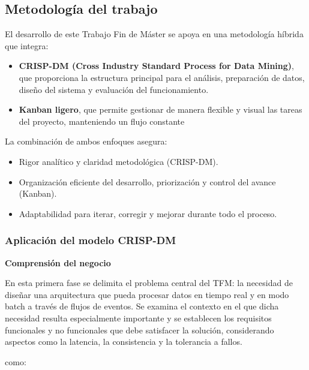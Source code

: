 \documentclass[12pt,a4paper]{article}
\providecommand{\tightlist}{%
  \setlength{\itemsep}{0pt}\setlength{\parskip}{0pt}}
\begin{document}
\subsection{Metodología del trabajo}\label{metodologuxeda-del-trabajo}

El desarrollo de este Trabajo Fin de Máster se apoya en una metodología híbrida que integra:

\begin{itemize}
    \tightlist
    \item
          \textbf{CRISP-DM (Cross Industry Standard Process for Data Mining)}, que proporciona la estructura principal para el análisis, preparación de datos, diseño del sistema y evaluación del funcionamiento.
    \item
          \textbf{Kanban ligero}, que permite gestionar de manera flexible y visual las tareas del proyecto, manteniendo un flujo constante
\end{itemize}

La combinación de ambos enfoques asegura:

\begin{itemize}
    \tightlist
    \item
          Rigor analítico y claridad metodológica (CRISP-DM).
    \item
          Organización eficiente del desarrollo, priorización y control del avance (Kanban).
    \item
          Adaptabilidad para iterar, corregir y mejorar durante todo el proceso.
\end{itemize}

\subsubsection{Aplicación del modelo CRISP-DM}

\textbf{Comprensión del negocio}

En esta primera fase se delimita el problema central del TFM: la necesidad de diseñar una arquitectura que pueda procesar datos en tiempo real y en modo batch a través de flujos de eventos. Se examina el contexto en el que dicha necesidad resulta especialmente importante y se establecen los requisitos funcionales y no funcionales que debe satisfacer la solución, considerando aspectos como la latencia, la consistencia y la tolerancia a fallos.

como:
\end{document}
